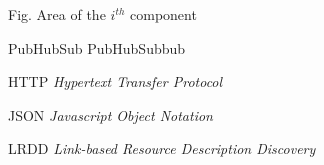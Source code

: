 \begin{siglas}
  \item[Fig.] Area of the $i^{th}$ component
  \item[PubHubSub] PubHubSubbub
  \item[HTTP] \textit{Hypertext Transfer Protocol}
  \item[JSON] \textit{Javascript Object Notation}
  \item[LRDD] \textit{Link-based Resource Description Discovery}
\end{siglas}
